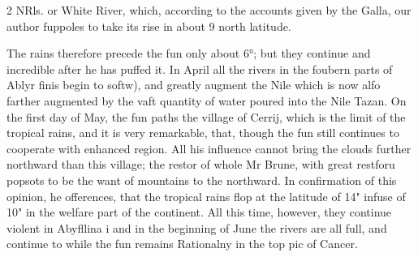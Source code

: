 \documentclass[10pt]{article}
\begin{document}
\begin{multicols}{2}\raggedcolumns
NRls. or White River, which, according to the accounts given by the Galla, our author fuppoles to take its rise in about 9 north latitude.

The rains therefore precede the fun only about 6°; but they continue and incredible after he has puffed it. In April all the rivers in the foubern parts of Ablyr finis begin to softw), and greatly augment the Nile which is now alfo farther augmented by the vaft quantity of water poured into the Nile Tazan. On the first day of May, the fun paths the village of Cerrij, which is the limit of the tropical rains, and it is very remarkable, that, though the fun still continues to cooperate with enhanced region. All his influence cannot bring the clouds further northward than this village; the restor of whole Mr Brune, with great restforu popsots to be the want of mountains to the northward. In confirmation of this opinion, he offerences, that the tropical rains flop at the latitude of 14" infuse of 10" in the welfare part of the continent. All this time, however, they continue violent in Abyfllina i and in the beginning of June the rivers are all full, and continue to while the fun remains Rationalny in the top pic of Cancer.


\end{multicols}
\end{document}
